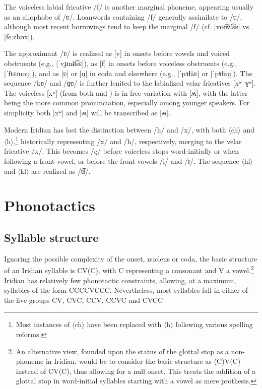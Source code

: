 The voiceless labial fricative /f/ is another marginal phoneme, appearing usually as an allophobe of /ʋ/. Loanwords containing /f/ generally assimilate to /ʋ/, although most recent borrowings tend to keep the marginal /f/ (cf.  [vɾɐ̃w̃t͡sɐ] vs.  [feːzbʊx]).

The approximant /ʋ/ is realized as [v] in onsets before vowels and voiced obstruents (e.g.,  [ˈvɟɪnɨt͡sɛ]), as [f] in onsets before voiceless obstruents (e.g.,  [ˈftɛɾnou̯]), and as [ʋ] or [u̯] in coda and elsewhere (e.g.,  [ˈpʲɪɫäʋ] or [ˈpʲɪɫäu̯]). The sequence /kʋ/ and /ɡʋ/ is further lenited to the labialized velar fricatives [xʷ~ɣʷ]. The voiceless [xʷ] (from both  and ) is in free variation with [ʍ], with the latter being the more common pronunciation, especially among younger speakers. For simplicity both [xʷ] and [ʍ] will be transcribed as [ʍ].

Modern Iridian has lost the distinction between /h/ and /x/, with both $\langle$ch$\rangle$ and $\langle$h$\rangle$,\footnote{Most instances of $\langle$ch$\rangle$ have been replaced with $\langle$h$\rangle$ following various spelling reforms.} historically representing /x/ and /h/, respectively, merging to the velar fricative /x/. This becomes /ç/ before voiceless stops word-initially or when following a front vowel, or before the front vowels /i/ and /ɪ/. The sequence $\langle$hl$\rangle$ and $\langle$kl$\rangle$ are realized as /t͡ɬ/.


\section{Phonotactics}\label{sec:phonotactics}

\subsection{Syllable structure}\label{sec:syllable-structure}

Ignoring the possible complexity of the onset, nucleus or coda, the basic structure of an Iridian syllable is CV(C), with C representing a consonant and V a vowel.\footnote{An alternative view, founded upon the status of the glottal stop as a non-phoneme in Iridian, would be to consider the basic structure as (C)V(C) instead of CV(C), thus allowing for a null onset. This treats the addition of a glottal stop in word-initial syllables starting with a vowel as mere prothesis.} Iridian has relatively few phonotactic constraints, allowing, at a maximum, syllables of the form CCCCVCCC. Nevertheless, most syllables fall in either of the five groups CV, CVC, CCV, CCVC and CVCC

